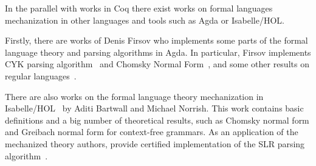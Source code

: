 In the parallel with works in Coq there exist works on formal languages mechanization in other languages and tools such as Agda or Isabelle/HOL.

Firstly, there are works of Denis Firsov who implements some parts of the formal language theory and parsing algorithms in Agda.
In particular, Firsov implements CYK parsing algorithm~\cite{firsov2014certified,firsov2016cfl} and Chomsky Normal Form~\cite{firsov2015certified}, and some other results on regular languages~\cite{10.1007/978-3-319-03545-1_7}.

There are also works on the formal language theory mechanization in Isabelle/HOL~\cite{1885-16399,barthwal2010formalisation,10.1007/978-3-642-13824-9_11} by Aditi Bartwall and Michael Norrish.
This work contains basic definitions and a big number of theoretical results, such as Chomsky normal form and Greibach normal form for context-free grammars. 
As an application of the mechanized theory authors, provide certified implementation of the SLR parsing algorithm~\cite{10.1007/978-3-642-00590-9_12}.




